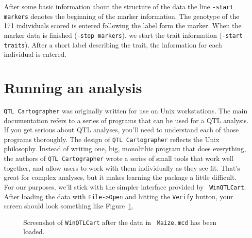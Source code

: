 \documentclass[12pt]{article}
\newcommand{\qtl}{{\tt QTL Cartographer}}
\begin{document}
After some basic information about the structure of the data the line
{\tt -start markers} denotes the beginning of the marker
information. The genotype of the 171 individuals scored is entered
following the label form the marker. When the marker data is finished
({\tt -stop markers}), we start the trait information ({\tt -start
traits}). After a short label describing the trait, the information
for each individual is entered.

\section*{Running an analysis}

\qtl{} was originally written for use on Unix workstations. The main
documentation refers to a series of programs that can be used for a
QTL analysis. If you get serious about QTL analyses, you'll need to
understand each of those programs thoroughly. The design of \qtl{}
reflects the Unix philosophy. Instead of writing one, big, monolithic
program that does everything, the authors of \qtl{} wrote a series of
small tools that work well together, and allow users to work with them
individually as they see fit. That's great for complex analyses, but
it makes learning the package a little difficult. For our purposes,
we'll stick with the simpler interface provided by {\tt
  WinQTLCart}. After loading the data with {\tt File->Open} and
hitting the {\tt Verify} button, your screen should look something
like Figure~\ref{fig:qtl-data-loaded}.

\begin{figure}
\begin{center}
\end{center}
\caption{Screenshot of {\tt WinQTLCart} after the data in {\tt
    Maize.mcd} has been loaded.}\label{fig:qtl-data-loaded}
\end{figure}
\end{document}
